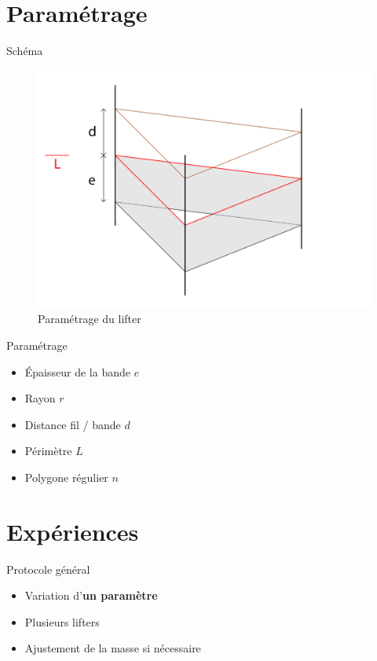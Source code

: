 \documentclass{beamer}
\begin{document}
	\section{Paramétrage}
	
		\begin{frame}{Schéma}
			\begin{figure}
				\center
				\includegraphics[scale=0.6]{img/lifter.png}
				\caption{Paramétrage du lifter}
			\end{figure}
		\end{frame}
	
		\begin{frame}{Paramétrage}
			\begin{itemize}
				\item Épaisseur de la bande $e$
				\item Rayon $r$
				\item Distance fil / bande $d$
				\item Périmètre $L$
				\item Polygone régulier $n$
			\end{itemize}
		\end{frame}
	
	\section{Expériences}
		\begin{frame}{Protocole général}
			\begin{itemize}
				\item Variation d'\textbf{un paramètre}
				\item Plusieurs lifters
				\item Ajustement de la masse si nécessaire
			\end{itemize}
		\end{frame}
	
\end{document}
